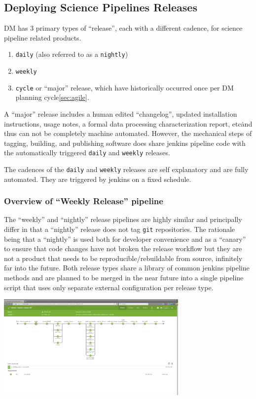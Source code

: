 \subsection{Deploying Science Pipelines Releases}
\label{sec:scipipe-deploy}

DM has 3 primary types of ``release'', each with a different cadence, for
science pipeline related products.

\begin{enumerate}
    \item \texttt{daily} (also referred to as a \texttt{nightly})
    \item \texttt{weekly}
    \item \texttt{cycle} or ``major'' release, which have historically occurred
        once per DM planning cycle\ref{sec:agile}.
\end{enumerate}

A ``major'' release includes a human edited ``changelog'', updated installation
instructions, usage notes, a formal data processing characterization report,
etc\.  and thus can not be completely machine automated.  However, the
mechanical steps of tagging, building, and publishing software does share
jenkins pipeline code with the automatically triggered \texttt{daily} and
\texttt{weekly} releases.

The cadences of the \texttt{daily} and \texttt{weekly} releases are self
explanatory and are fully automated. They are triggered by jenkins on a fixed
schedule.

\subsubsection{Overview of ``Weekly Release'' pipeline}
\label{sec:releases_weekly}
\label{sec:releases_daily}

The ``weekly'' and ``nightly'' release pipelines are highly similar and
principally differ in that a ``nightly'' release does not tag \texttt{git}
repositories.  The rationale being that a ``nightly'' is used both for
developer convenience and as a ``canary'' to ensure that code changes have not
broken the release workflow but they are not a product that needs to be
reproducible/rebuildable from source, infinitely far into the future.  Both
release types share a library of common jenkins pipeline methods and are
planned to be merged in the near future into a single pipeline script that uses
only separate external configuration per release type.

\includegraphics[width=0.7\textwidth]{pipelinedeploy-weekly-release}

